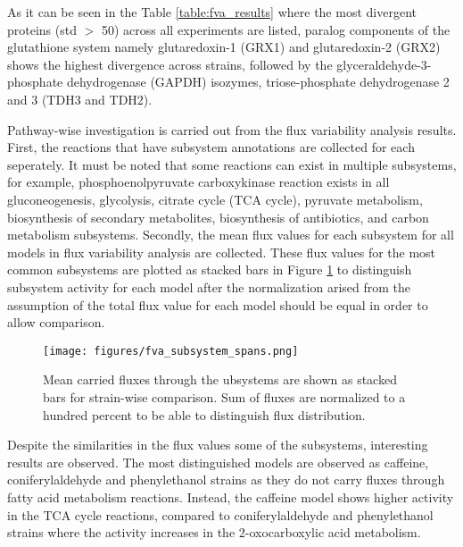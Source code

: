 As it can be seen in the Table \ref{table:fva_results} where the most divergent proteins (std $>$ 50) across all experiments are listed, paralog components of the glutathione system namely glutaredoxin-1 (GRX1) and glutaredoxin-2 (GRX2) shows the highest divergence across strains, followed by the glyceraldehyde-3-phosphate dehydrogenase (GAPDH) isozymes, triose-phosphate dehydrogenase 2 and 3 (TDH3 and TDH2).



Pathway-wise investigation is carried out from the flux variability analysis results. First, the reactions that have subsystem annotations are collected for each seperately. It must be noted that some reactions can exist in multiple subsystems, for example, phosphoenolpyruvate carboxykinase reaction exists in all gluconeogenesis, glycolysis, citrate cycle (TCA cycle), pyruvate metabolism, biosynthesis of secondary metabolites, biosynthesis of antibiotics, and carbon metabolism subsystems. Secondly, the mean flux values for each subsystem for all models in flux variability analysis are collected. These flux values for the most common subsystems are plotted as stacked bars in Figure \ref{fig:fva_subsystem_spans} to distinguish subsystem activity for each model after the normalization arised from the assumption of the total flux value for each model should be equal in order to allow comparison.

\begin{figure}[H]
  \begin{center}
  \texttt{[image: figures/fva\_subsystem\_spans.png]}
  \caption[Mean carried fluxes through the ubsystems are shown as stacked bars for strain-wise comparison. Sum of fluxes are normalized to a hundred percent to be able to distinguish flux distribution]{Mean carried fluxes through the ubsystems are shown as stacked bars for strain-wise comparison. Sum of fluxes are normalized to a hundred percent to be able to distinguish flux distribution.}
  \label{fig:fva_subsystem_spans}
  \end{center}
\end{figure}

Despite the similarities in the flux values some of the subsystems, interesting results are observed. The most distinguished models are observed as caffeine, coniferylaldehyde and phenylethanol strains as they do not carry fluxes through fatty acid metabolism reactions. Instead, the caffeine model shows higher activity in the TCA cycle reactions, compared to coniferylaldehyde and phenylethanol strains where the activity increases in the 2-oxocarboxylic acid metabolism.

